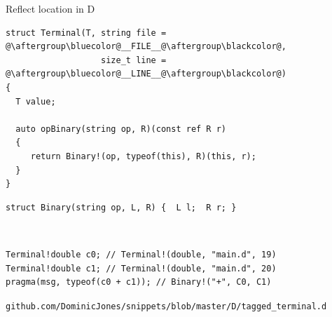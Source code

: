 \documentclass[xcolor=dvipsnames]{beamer}
\begin{document}
\begin{frame}[fragile]{Reflect location in D}
\begin{lstlisting}
struct Terminal(T, string file = @\aftergroup\bluecolor@__FILE__@\aftergroup\blackcolor@,
                   size_t line = @\aftergroup\bluecolor@__LINE__@\aftergroup\blackcolor@)
{
  T value;

  auto opBinary(string op, R)(const ref R r)
  {
     return Binary!(op, typeof(this), R)(this, r);
  }
}
\end{lstlisting}

\begin{lstlisting}
struct Binary(string op, L, R) {  L l;  R r; }
\end{lstlisting}

~

\begin{lstlisting}
Terminal!double c0; // Terminal!(double, "main.d", 19)
Terminal!double c1; // Terminal!(double, "main.d", 20)
pragma(msg, typeof(c0 + c1)); // Binary!("+", C0, C1)
\end{lstlisting}

\vspace{5mm}
\footnotesize{\texttt{github.com/DominicJones/snippets/blob/master/D/tagged\_terminal.d}}
\end{frame}


\begin{frame}[plain]
  \titlepage
\end{frame}
\end{document}
